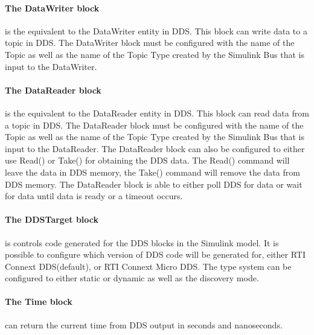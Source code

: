 \paragraph{The DataWriter block} is the equivalent to the DataWriter entity in DDS. This block can write data to a topic in DDS. The DataWriter block must be configured with the name of the Topic as well as the name of the Topic Type created by the Simulink Bus that is input to the DataWriter.

\paragraph{The DataReader block} is the equivalent to the DataReader entity in DDS. This block can read data from a topic in DDS. The DataReader block must be configured with the name of the Topic as well as the name of the Topic Type created by the Simulink Bus that is input to the DataReader. The DataReader block can also be configured to either use Read() or Take() for obtaining the DDS data. The Read() command will leave the data in DDS memory, the Take() command will remove the data from DDS memory. The DataReader block is able to either poll DDS for data or wait for data until data is ready or a timeout occurs.

\paragraph{The DDSTarget block} is controls code generated for the DDS blocks in the Simulink model. It is possible to configure which version of DDS code will be generated for, either RTI Connext DDS(default), or RTI Connext Micro DDS. The type system can be configured to either static or dynamic as well as the discovery mode.

\paragraph{The Time block} can return the current time from DDS output in seconds and nanoseconds.